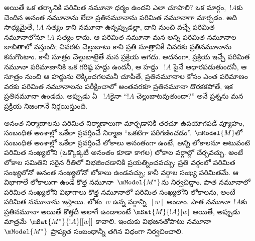 \documentclass[../../../include/open-logic-section]{subfiles}
\begin{document}
అయితే ఒక తర్కానికి పరిమిత నమూనా ధర్మం ఉందని ఎలా
చూపాలి? ఒక మార్గం,~$!A$కు చెందిన అనంత నమూనాను లేదా
ప్రతినమూనాను పరిమిత నమూనాగా మార్చడం. అది సాధ్యమైతే, $!A$ సత్యం
కాని నమూనా ఉన్నప్పుడల్లా, దాని నుంచి వచ్చే పరిమిత
నమూనాలోనూ $!A$ సత్యం కాదు. ఆ పరిమిత నమూనా మన అన్ని
పరిమిత నమూనాల జాబితాలో వస్తుంది; చివరకు చెల్లుబాటు
కాని ప్రతి సూత్రానికీ చివరకు ప్రతినమూనాను కనుగొంటాం. కానీ
సూత్రం చెల్లుబాటైతే మన ప్రక్రియ ఆగదు. అదనంగా,
ప్రక్రియ ఇచ్చే పరిమిత నమూనా పరిమాణానికి ఒక గరిష్ఠ
హద్దు ఉందనీ, ఆ హద్దు ~$!A$
పైనే ఆధారపడుతుందనీ, ఆ సూత్రం నుంచి ఆ హద్దును లెక్కించగలమనీ
చూపితే, ప్రతినమూనాల కోసం
ఎంత పరిమాణం వరకు పరిమిత నమూనాలను పరీక్షించాలో
అంతవరకూ ప్రతినమూనా దొరకకపోతే, ఇక ప్రతినమూనా ఉండదు.
అప్పుడు ఏ ~$!A$కైనా
``$!A$ చెల్లుబాటవుతుందా?'' అనే ప్రశ్నను మన ప్రక్రియ
నిజంగానే నిర్ణయిస్తుంది.

అనంత నిర్మాణాలను పరిమిత నిర్మాణాలుగా మార్చడానికి
తరచూ ఉపయోగపడే వ్యూహం, సంబంధిత అంశాల్లో ఒకేలా
ప్రవర్తించే నిర్మాణ 
``ఒకటిగా పరిగణించడం''. $\mModel{M}$లో సంబంధిత అంశాల్లో
ఒకేలా ప్రవర్తించే లోకాలు అనంతంగా ఉంటే, \emph{అన్ని}
లోకాలనూ అటువంటి పరిమిత సంఖ్యలోని (ఒక్కొక్కటి అనంతం కూడా కాగల)
లోకాల వర్గాల్లో చేర్చవచ్చు. అంటే లోకాల సమితిని
సరైన రీతిలో విభజించడానికి ప్రయత్నించవచ్చు: ప్రతి వర్గంలో పరిమిత సంఖ్యలోనో
అనంత సంఖ్యలోనో లోకాలు ఉండవచ్చు; కానీ వర్గాల సంఖ్య
పరిమితమే.
ఆ విభాగాలే లోకాలుగా ఉండే కొత్త నమూనా~$\mModel{M^*}$ను
నిర్వచిద్దాం. పాత నమూనాలో పరిమిత సంఖ్యలోని విభాగాలు
కొత్త నమూనాలో పరిమిత సంఖ్యలోని లోకాలను, అంటే పరిమిత
నమూనాను ఇస్తాయి. లోకం~$w$ ఉన్న వర్గాన్ని~$[w]$
అందాం. పాత నమూనా~$!A$కు ప్రతినమూనా అయితే కొత్తదీ
అలాగే ఉండాలంటే $\mSat{M}{!A}[w]$ అయితే, అప్పుడు మాత్రమే
$\mSat{M^*}{!A}[{[w]}]$ కావాలి. ఇందుకు విభజనతోపాటు
నమూనా~$\mModel{M^*}$ ప్రాప్యత సంబంధాన్నీ తగిన విధంగా
నిర్వచించాలి.
\end{document}
